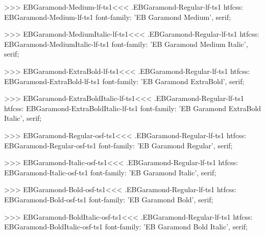 {{{{{{{>>>
\<EBGaramond-Medium-lf-ts1\><<<
.EBGaramond-Regular-lf-ts1
htfcss:  EBGaramond-Medium-lf-ts1  font-family: 'EB Garamond Medium', serif;

>>>
\<EBGaramond-MediumItalic-lf-ts1\><<<
.EBGaramond-Regular-lf-ts1
htfcss:  EBGaramond-MediumItalic-lf-ts1  font-family: 'EB Garamond Medium Italic', serif;

>>>
\<EBGaramond-ExtraBold-lf-ts1\><<<
.EBGaramond-Regular-lf-ts1
htfcss:  EBGaramond-ExtraBold-lf-ts1  font-family: 'EB Garamond ExtraBold', serif;

>>>
\<EBGaramond-ExtraBoldItalic-lf-ts1\><<<
.EBGaramond-Regular-lf-ts1
htfcss:  EBGaramond-ExtraBoldItalic-lf-ts1  font-family: 'EB Garamond ExtraBold Italic', serif;

>>>
\<EBGaramond-Regular-osf-ts1\><<<
.EBGaramond-Regular-lf-ts1
htfcss:  EBGaramond-Regular-osf-ts1  font-family: 'EB Garamond Regular', serif;

>>>
\<EBGaramond-Italic-osf-ts1\><<<
.EBGaramond-Regular-lf-ts1
htfcss:  EBGaramond-Italic-osf-ts1  font-family: 'EB Garamond Italic', serif;

>>>
\<EBGaramond-Bold-osf-ts1\><<<
.EBGaramond-Regular-lf-ts1
htfcss:  EBGaramond-Bold-osf-ts1  font-family: 'EB Garamond Bold', serif;

>>>
\<EBGaramond-BoldItalic-osf-ts1\><<<
.EBGaramond-Regular-lf-ts1
htfcss:  EBGaramond-BoldItalic-osf-ts1  font-family: 'EB Garamond Bold Italic', serif;

}}}}}}}
